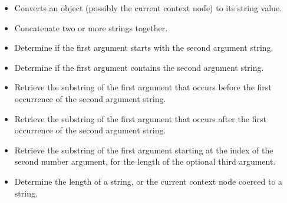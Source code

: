 \documentclass[20pt,landscape,headrule,footrule]{foils}
\begin{document}
\begin{minipage}{\textwidth}
\small
\begin{itemize}
  \item {} 
    Converts an object (possibly the current context node) to its
    string value.
  \item {}
    Concatenate two or more strings together.  
  \item {}
    Determine if the first argument starts with the second argument
string.
  \item {}
    Determine if the first argument contains the second argument
string.
\end{itemize}
\end{minipage}

\begin{minipage}{\textwidth}
\small
\begin{itemize}
  \item {}
    Retrieve the substring of the first argument that occurs before
    the first occurrence of the second argument string.
  \item {}
    Retrieve the substring of the first argument that occurs after
    the first occurrence of the second argument string.
  \item {}
    Retrieve the substring of the first argument starting at the index
    of the second number argument, for the length of the optional
    third argument.
  \item {}
    Determine the length of a string, or the current context node
    coerced to a string.
\end{itemize}
\end{minipage}
\end{document}
